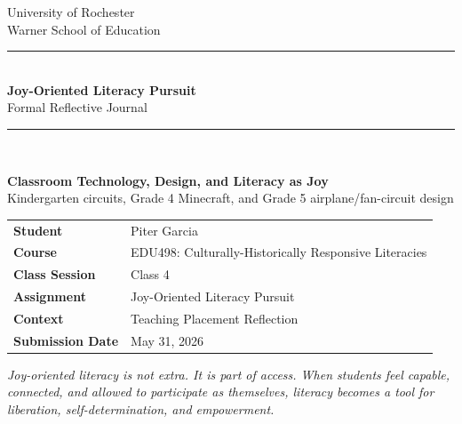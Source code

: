 \documentclass[12pt]{article}
\begin{document}
\begin{titlepage}
\thispagestyle{empty}

\begin{center}
    \vspace*{0.25in}
    {\large University of Rochester\\}
    {\normalsize Warner School of Education\\[0.35in]}

    {\color{PrimaryRed}\rule{\textwidth}{1.4pt}}\\[0.22in]
    {\Huge\bfseries Joy-Oriented Literacy Pursuit\\[0.12in]}
    {\Large Formal Reflective Journal\\[0.22in]}
    {\color{PrimaryRed}\rule{0.72\textwidth}{0.7pt}}\\[0.32in]

    \colorbox{SoftBlue}{%
        \parbox{0.86\textwidth}{%
            \centering\vspace{0.12in}
            \textbf{Classroom Technology, Design, and Literacy as Joy}\\[0.05in]
            Kindergarten circuits, Grade 4 Minecraft, and Grade 5 airplane/fan-circuit design
            \vspace{0.12in}
        }%
    }
\end{center}

\vspace{0.75in}

\begin{center}
\renewcommand{\arraystretch}{1.35}
\begin{tabular}{>{\bfseries\RaggedLeft}p{1.55in} p{4.85in}}
Student & Piter Garcia \\
Course & EDU498: Culturally-Historically Responsive Literacies \\
Class Session & Class 4 \\
Assignment & Joy-Oriented Literacy Pursuit \\
Context & Teaching Placement Reflection \\
Submission Date & May 31, 2026 \\
\end{tabular}
\end{center}

\vfill

\begin{center}
\begin{minipage}{0.78\textwidth}
\centering
\itshape
Joy-oriented literacy is not extra. It is part of access. When students feel capable, connected, and allowed to participate as themselves, literacy becomes a tool for liberation, self-determination, and empowerment.
\end{minipage}
\end{center}

\restoregeometry
\end{titlepage}
\clearpage
\end{document}
